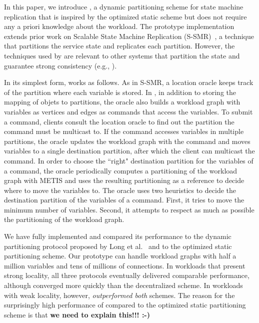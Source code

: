 In this paper, we introduce \dynastar, a dynamic partitioning scheme
for state machine replication that is inspired by the optimized static
scheme but does not require any a priori knowledge about the workload.
The \dynastar prototype implementation extends prior work on Scalable
State Machine Replication (S-SMR)~\cite{ssmr}, a technique that
partitions the service state and replicates each partition.  However,
the techniques used by \dynastar are relevant to other systems that
partition the state and guarantee strong consistency (e.g.,
\cite{xxx}).



%
In its simplest form, \dynastar works as follows.  As in S-SMR, a
location oracle keeps track of the partition where each variable is
stored.  In \dynastar, in addition to storing the mapping of objets to
partitions, the oracle also builds a workload graph with variables as
vertices and edges as commands that access the variables.  To submit a
command, clients consult the location oracle to find out the partition
the command must be multicast to.  If the command accesses variables in
multiple partitions, the oracle updates the workload graph with the
command and moves variables to a single destination partition, after
which the client can multicast the command.  In order to choose the
``right" destination partition for the variables of a command, the
oracle periodically computes a partitioning of the workload graph with
METIS and uses the resulting partitioning as a reference to decide
where to move the variables to.  The oracle uses two heuristics to
decide the destination partition of the variables of a command.  First,
it tries to move the minimum number of variables.  Second, it attempts
to respect as much as possible the partitioning of the workload graph.

We have fully implemented \dynastar and compared its performance to
the dynamic partitioning protocol proposed by Long et
al.~\cite{hoang2016} and to the optimized static partitioning scheme.
Our prototype can handle workload graphs with half a million variables
and tens of millions of connections.  In workloads that present strong
locality, all three protocols eventually delivered comparable
performance, although \dynastar converged more quickly than the
decentralized scheme.  In workloads with weak locality, however,
\dynastar \emph{outperformed both} schemes.  The reason for the
surprisingly high performance of \dynastar compared to the optimized
static partitioning scheme is that \textbf{we need to explain this!!!
  :-)}

